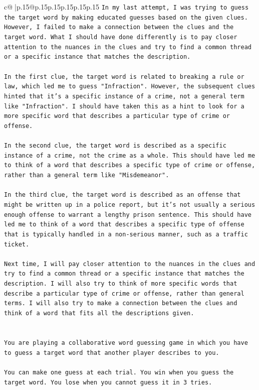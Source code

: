 \documentclass{article}
\begin{document}
{\begin{supertabular}{c@{$\;$}|p{.15\linewidth}@{}p{.15\linewidth}p{.15\linewidth}p{.15\linewidth}p{.15\linewidth}p{.15\linewidth}}
{{{\texttt{In my last attempt, I was trying to guess the target word by making educated guesses based on the given clues. However, I failed to make a connection between the clues and the target word. What I should have done differently is to pay closer attention to the nuances in the clues and try to find a common thread or a specific instance that matches the description.} \\
\\ 
\texttt{In the first clue, the target word is related to breaking a rule or law, which led me to guess "Infraction". However, the subsequent clues hinted that it's a specific instance of a crime, not a general term like "Infraction". I should have taken this as a hint to look for a more specific word that describes a particular type of crime or offense.} \\
\\ 
\texttt{In the second clue, the target word is described as a specific instance of a crime, not the crime as a whole. This should have led me to think of a word that describes a specific type of crime or offense, rather than a general term like "Misdemeanor".} \\
\\ 
\texttt{In the third clue, the target word is described as an offense that might be written up in a police report, but it's not usually a serious enough offense to warrant a lengthy prison sentence. This should have led me to think of a word that describes a specific type of offense that is typically handled in a non{-}serious manner, such as a traffic ticket.} \\
\\ 
\texttt{Next time, I will pay closer attention to the nuances in the clues and try to find a common thread or a specific instance that matches the description. I will also try to think of more specific words that describe a particular type of crime or offense, rather than general terms. I will also try to make a connection between the clues and think of a word that fits all the descriptions given.} \\
\\ 
\\ 
\texttt{You are playing a collaborative word guessing game in which you have to guess a target word that another player describes to you.} \\
\\ 
\texttt{You can make one guess at each trial. You win when you guess the target word. You lose when you cannot guess it in 3 tries.} \\
}}}
\end{supertabular}}
\end{document}
